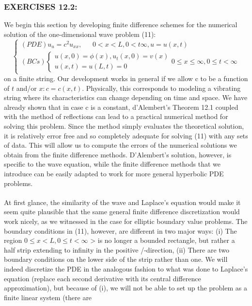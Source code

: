 \documentclass[../main.tex]{subfiles}
\begin{document}
{{\subsubsection{EXERCISES 12.2:}
We begin this section by developing finite difference schemes for the numerical 
solution of the one-dimensional wave problem (11):
$$\begin{cases} 
	(PDE) u_u=c^2u_{xx}, ~~~~~~~ 
	0< x< L, 0<t \infty , u=u(x,t) \\ 
	(BCs)
	\begin{cases} 
	u(x,0)=\phi (x), u_t(x,0)=v(x)\\
	u(x,t)=u(L,t)=0
	\end{cases}
	0 \leqslant x \leqslant\infty, 0\leqslant t< \infty 
\end{cases}$$
on a finite string. Our development works in general if we allow c to be a function 
of $t$ and/or $x: c = c(x,t)$. Physically, this corresponds to modeling a vibrating string 
where its characteristics can change depending on time and space. We have 
already shown that in case c is a constant, d'Alembert's Theorem 12.1 coupled 
with the method of reflections can lead to a practical numerical method for solving 
this problem. Since the method simply evaluates the theoretical solution, it is 
relatively error free and so completely adequate for solving (11) with any sets of 
data. This will allow us to compute the errors of the numerical solutions we obtain 
from the finite difference methods. D'Alembert's solution, however, is specific to 
the wave equation, while the finite difference methods that we introduce can be 
easily adapted to work for more general hyperbolic PDE problems. 
\\
\\
At first glance, the similarity of the wave and Laplace's equation would make it 
seem quite plausible that the same general finite difference discretization would 
work nicely, as we witnessed in the case for elliptic boundary value problems. 
The boundary conditions in (11), however, are different in two major ways: (i) 
The region  
$0 \leqslant x < L, 0 \leqslant t < \infty$
> is no longer a bounded rectangle, but rather a half 
strip extending to infinity in the positive /-direction, (ii) There are two boundary 
conditions on the lower side of the strip rather than one. We will indeed discretize 
the PDE in the analogous fashion to what was done to Laplace's equation (replace 
each second derivative with its central difference approximation), but because of 
(i), we will not be able to set up the problem as a finite linear system (there are 
}}
\end{document}
